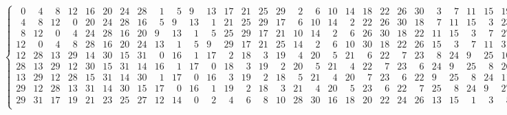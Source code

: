 \documentclass[fleqn, a4paper,12pt]{article}
\begin{document}
\renewcommand{\arraystretch}{1} %

\small
\[
\begin{Bmatrix}
\phantom{0}0 & \phantom{0}4 & \phantom{0}8 & 12 & 16 & 20 & 24 & 28 & \phantom{0}1 & \phantom{0}5 & 9 & 13 & 17 & 21 & 25 & 29 & \phantom{0}2 & \phantom{0}6 & 10 & 14 & 18 & 22 & 26 & 30 & \phantom{0}3 & \phantom{0}7 & 11 & 15 & 19 & 23 & 27 & 31 \\
\phantom{0}4 & \phantom{0}8 & 12 & \phantom{0}0 & 20 & 24 & 28 & 16 & \phantom{0}5 & 9 & 13 & \phantom{0}1 & 21 & 25 & 29 & 17 & \phantom{0}6 & 10 & 14 & \phantom{0}2 & 22 & 26 & 30 & 18 & \phantom{0}7 & 11 & 15 & \phantom{0}3 & 23 & 27 & 31 & 19 \\
\phantom{0}8 & 12 & \phantom{0}0 & \phantom{0}4 & 24 & 28 & 16 & 20 & 9 & 13 & \phantom{0}1 & \phantom{0}5 & 25 & 29 & 17 & 21 & 10 & 14 & \phantom{0}2 & \phantom{0}6 & 26 & 30 & 18 & 22 & 11 & 15 & \phantom{0}3 & \phantom{0}7 & 27 & 31 & 19 & 23 \\
12 & \phantom{0}0 & \phantom{0}4 & \phantom{0}8 & 28 & 16 & 20 & 24 & 13 & \phantom{0}1 & \phantom{0}5 & 9 & 29 & 17 & 21 & 25 & 14 & \phantom{0}2 & \phantom{0}6 & 10 & 30 & 18 & 22 & 26 & 15 & \phantom{0}3 & \phantom{0}7 & 11 & 31 & 19 & 23 & 27 \\
12 & 28 & 13 & 29 & 14 & 30 & 15 & 31 & \phantom{0}0 & 16 & \phantom{0}1 & 17 & \phantom{0}2 & 18 & \phantom{0}3 & 19 & \phantom{0}4 & 20 & \phantom{0}5 & 21 & \phantom{0}6 & 22 & \phantom{0}7 & 23 & \phantom{0}8 & 24 & 9 & 25 & 10 & 26 & 11 & 27 \\
28 & 13 & 29 & 12 & 30 & 15 & 31 & 14 & 16 & \phantom{0}1 & 17 & \phantom{0}0 & 18 & \phantom{0}3 & 19 & \phantom{0}2 & 20 & \phantom{0}5 & 21 & \phantom{0}4 & 22 & \phantom{0}7 & 23 & \phantom{0}6 & 24 & 9 & 25 & \phantom{0}8 & 26 & 11 & 27 & 10 \\
13 & 29 & 12 & 28 & 15 & 31 & 14 & 30 & \phantom{0}1 & 17 & \phantom{0}0 & 16 & \phantom{0}3 & 19 & \phantom{0}2 & 18 & \phantom{0}5 & 21 & \phantom{0}4 & 20 & \phantom{0}7 & 23 & \phantom{0}6 & 22 & 9 & 25 & \phantom{0}8 & 24 & 11 & 27 & 10 & 26 \\
29 & 12 & 28 & 13 & 31 & 14 & 30 & 15 & 17 & \phantom{0}0 & 16 & \phantom{0}1 & 19 & \phantom{0}2 & 18 & \phantom{0}3 & 21 & \phantom{0}4 & 20 & \phantom{0}5 & 23 & \phantom{0}6 & 22 & \phantom{0}7 & 25 & \phantom{0}8 & 24 & 9 & 27 & 10 & 26 & 11 \\
29 & 31 & 17 & 19 & 21 & 23 & 25 & 27 & 12 & 14 & \phantom{0}0 & \phantom{0}2 & \phantom{0}4 & \phantom{0}6 & \phantom{0}8 & 10 & 28 & 30 & 16 & 18 & 20 & 22 & 24 & 26 & 13 & 15 & \phantom{0}1 & \phantom{0}3 & \phantom{0}5 & \phantom{0}7 & 9 & 11 \\

\end{Bmatrix}\]
\end{document}
